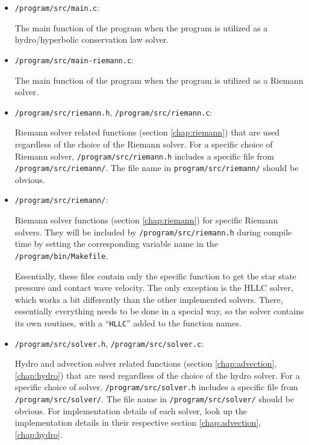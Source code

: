 \begin{itemize}
			
	\item 	\texttt{/program/src/main.c}:
			
			The main function of the program when the program is utilized as a hydro/hyperbolic conservation law solver.
			
	\item 	\texttt{/program/src/main-riemann.c}:
			
			The main function of the program when the program is utilized as a Riemann solver.
			
			
	\item 	\texttt{/program/src/riemann.h}, \texttt{/program/src/riemann.c}:
	
			Riemann solver related functions (section \ref{chap:riemann}) that are used regardless of the choice of the Riemann solver.
			For a specific choice of Riemann solver, \texttt{/program/src/riemann.h} includes a specific file from \texttt{/program/src/riemann/}.
			The file name in \texttt{program/src/riemann/} should be obvious.
			
	\item 	\texttt{/program/src/riemann/}:
	
			Riemann solver functions (section \ref{chap:riemann}) for specific Riemann solvers.
			They will be included by \texttt{/program/src/riemann.h} during compile time by setting the corresponding variable name in the \texttt{/program/bin/Makefile}.
			
			Essentially, these files contain only the specific function to get the star state pressure and contact wave velocity.
			The only exception is the HLLC solver, which works a bit differently than the other implemented solvers.
			There, essentially everything needs to be done in a special way, so the solver contains its own routines, with a ``\texttt{HLLC}'' added to the function names.

	\item 	\texttt{/program/src/solver.h}, \texttt{/program/src/solver.c}:
	
			Hydro and advection solver related functions (section \ref{chap:advection}, \ref{chap:hydro}) that are used regardless of the choice of the hydro solver.
			For a specific choice of solver, \texttt{/program/src/solver.h} includes a specific file from \texttt{/program/src/solver/}.
			The file name in \texttt{/program/src/solver/} should be obvious.
			For implementation details of each solver, look up the implementation details in their respective section \ref{chap:advection}, \ref{chap:hydro}.
			

\end{itemize}
